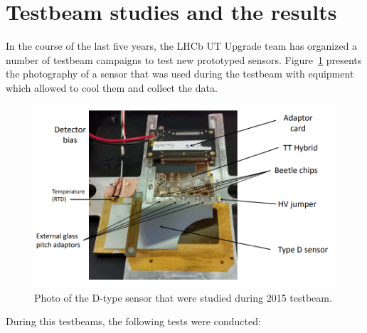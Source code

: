 \section{Testbeam studies and the results}
In the course of the last five years, the LHCb UT Upgrade team has organized a number of testbeam campaigns to test new prototyped sensors. Figure~\ref{fig:DUT} presents the photography of a sensor that was used during the testbeam with equipment which allowed to cool
them and collect the data. 

\begin{figure}
\centering
\includegraphics{figures/Sensor_photo.PNG}
\caption{Photo of the D-type sensor that were studied during 2015 testbeam.}
\label{fig:DUT}
\end{figure}



During this testbeams, the following tests were conducted: 

